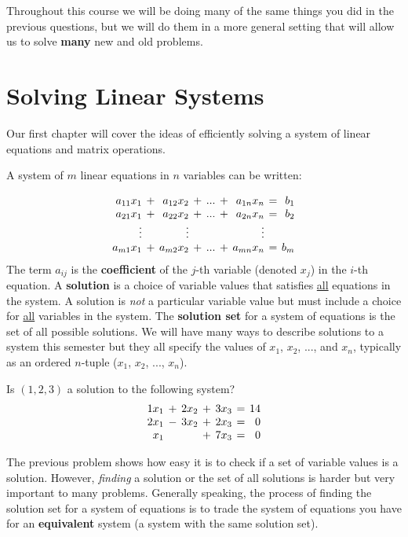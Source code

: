 Throughout this course we will be doing many of the same things you did in the previous questions, but we will do them in a more general setting that will allow us to solve \textbf{many} new and old problems.

\newpage
\section{Solving Linear Systems}
Our first chapter will cover the ideas of efficiently solving a system of linear equations and matrix operations.

A system of $m$ linear equations in $n$ variables can be written:

\begin{equation*}
\setlength{\arraycolsep}{2pt}
\begin{array}{rcrcrcrcr}
  a_{11} x_1  &+& a_{12} x_2 &+& ... &+&  a_{1n}x_n &=& b_1 \\
  a_{21} x_1  &+& a_{22} x_2 &+& ... &+&  a_{2n}x_n &=& b_2 \\
  \vdots  & & \vdots & &  & &  \vdots &&  \\
  a_{m1} x_1  &+& a_{m2} x_2 &+& ... &+&  a_{mn}x_n &=& b_m
\end{array}
\end{equation*}
The term $a_{ij}$ is the \textbf{coefficient} of the $j$-th variable (denoted $x_j$) in the $i$-th equation. A \textbf{solution} is a choice of variable values that satisfies \underline{all} equations in the system. A solution is \emph{not} a particular variable value but must include a choice for \underline{all} variables in the system. The \textbf{solution set} for a system of equations is the set of all possible solutions. We will have many ways to describe solutions to a system this semester but they all specify the values of $x_1$, $x_2$, ..., and $x_n$, typically as an ordered $n$-tuple ($x_1$, $x_2$, ..., $x_n$).

\bq Is $(1,2,3)$ a solution to the following system?
\begin{equation*}
\setlength{\arraycolsep}{2pt}
\begin{array}{rcrcrcrcr}
  1 x_1  &+& 2 x_2 &+& 3 x_3 &=& 14 \\ %
  2 x_1  &-& 3 x_2 &+& 2 x_3 &=& 0 \\
   x_1   & &       &+& 7 x_3 &=& 0
\end{array}
\end{equation*}
\eq

The previous problem shows how easy it is to check if a set of variable values is a solution. However, \emph{finding} a solution or the set of all solutions is harder but very important to many problems. Generally speaking, the process of finding the solution set for a system of equations is to trade the system of equations you have for an \textbf{equivalent} system (a system with the same solution set).

